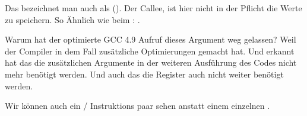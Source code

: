 Das bezeichnet man auch als  (\ARMPCS).
Der Callee, ist hier nicht in der Pflicht die Werte zu speichern.
So Ähnlich wie beim : .


Warum hat der optimierte GCC 4.9 Aufruf dieses Argument weg gelassen?
Weil der Compiler in dem Fall zusätzliche Optimierungen gemacht hat. Und
erkannt hat das die zusätzlichen Argumente in der weiteren Ausführung des 
Codes nicht mehr benötigt werden. Und auch das die Register  auch 
nicht weiter benötigt werden.


Wir können auch ein / Instruktions paar sehen anstatt einem einzelnen
.

